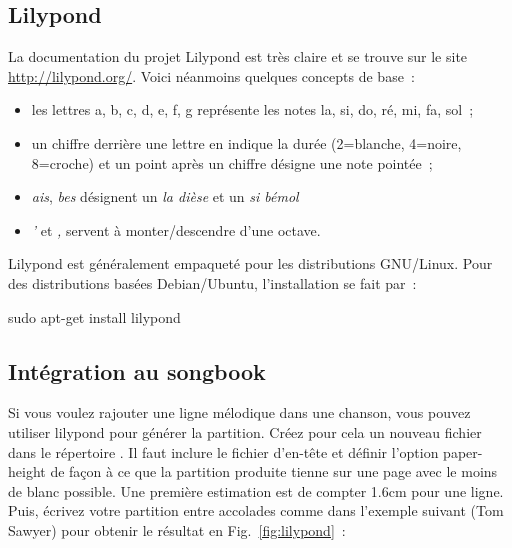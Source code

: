 \documentclass[online]{patacrep}
\begin{document}
\subsection{Lilypond}

La documentation du projet Lilypond est très
claire et se trouve sur le site \url{http://lilypond.org/}.
Voici néanmoins quelques concepts de base~:

\begin{itemize}
\item les lettres a, b, c, d, e, f, g représente les notes la, si, do,
  ré, mi, fa, sol~;
\item un chiffre derrière une lettre en indique la durée (2=blanche, 4=noire,
  8=croche) et un point après un chiffre désigne une note pointée~;
\item \emph{ais}, \emph{bes} désignent un \emph{la dièse} et un \emph{si bémol}
\item \emph{'} et \emph{,} servent à monter/descendre d'une octave.
\end{itemize}

Lilypond est généralement empaqueté pour les distributions
GNU/Linux. Pour des distributions basées Debian/Ubuntu, l'installation
se fait par~:

\begin{unixcom}
  sudo apt-get install lilypond
\end{unixcom}


\subsection{Intégration au songbook}

Si vous voulez rajouter une ligne mélodique dans une chanson, vous
pouvez utiliser lilypond pour générer la partition. Créez pour cela un
nouveau fichier  dans le répertoire
.  Il faut inclure le fichier d'en-tête
 et définir l'option paper-height de façon à ce que la
partition produite tienne sur une page avec le moins de blanc
possible. Une première estimation est de compter 1.6cm pour une
ligne. Puis, écrivez votre partition entre accolades comme dans
l'exemple suivant (Tom Sawyer) pour obtenir le résultat en
Fig.~\ref{fig:lilypond}~:
\end{document}

